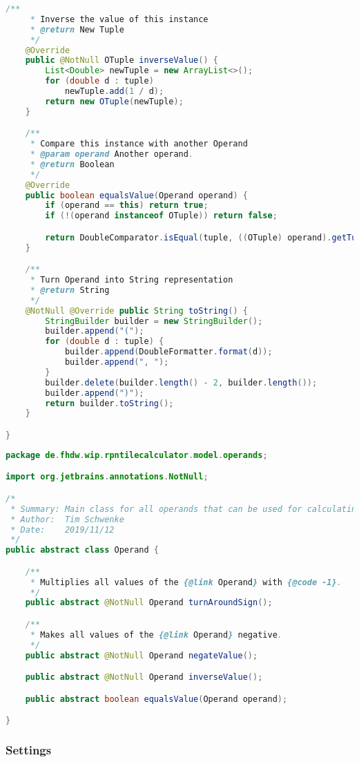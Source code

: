 \begin{lstlisting}[caption=OTuple (Meinerzhagen),label=list:OTuple,language=Java]
    /**
     * Inverse the value of this instance
     * @return New Tuple
     */
    @Override
    public @NotNull OTuple inverseValue() {
        List<Double> newTuple = new ArrayList<>();
        for (double d : tuple)
            newTuple.add(1 / d);
        return new OTuple(newTuple);
    }

    /**
     * Compare this instance with another Operand
     * @param operand Another operand.
     * @return Boolean
     */
    @Override
    public boolean equalsValue(Operand operand) {
        if (operand == this) return true;
        if (!(operand instanceof OTuple)) return false;

        return DoubleComparator.isEqual(tuple, ((OTuple) operand).getTuple());
    }

    /**
     * Turn Operand into String representation
     * @return String
     */
    @NotNull @Override public String toString() {
        StringBuilder builder = new StringBuilder();
        builder.append("(");
        for (double d : tuple) {
            builder.append(DoubleFormatter.format(d));
            builder.append(", ");
        }
        builder.delete(builder.length() - 2, builder.length());
        builder.append(")");
        return builder.toString();
    }

}
\end{lstlisting}    

\begin{lstlisting}[caption=Operand (Meinerzhagen),label=list:Operand,language=Java]
package de.fhdw.wip.rpntilecalculator.model.operands;

import org.jetbrains.annotations.NotNull;

/*
 * Summary: Main class for all operands that can be used for calculating
 * Author:  Tim Schwenke
 * Date:    2019/11/12
 */
public abstract class Operand {

    /**
     * Multiplies all values of the {@link Operand} with {@code -1}.
     */
    public abstract @NotNull Operand turnAroundSign();

    /**
     * Makes all values of the {@link Operand} negative.
     */
    public abstract @NotNull Operand negateValue();

    public abstract @NotNull Operand inverseValue();

    public abstract boolean equalsValue(Operand operand);

}
\end{lstlisting}    

\subsubsection{Settings}


